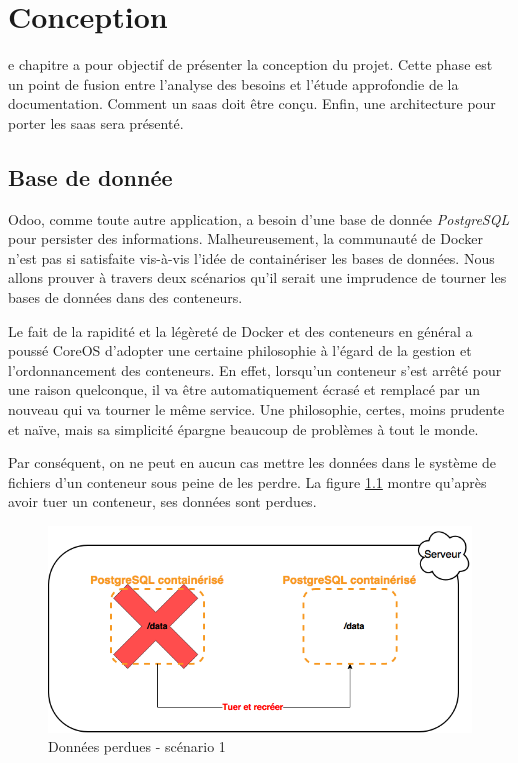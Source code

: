 \chapter{Conception}
\begin{onehalfspace}

e chapitre a pour objectif de présenter la conception du projet. Cette phase est un point de fusion entre l'analyse des besoins et l'étude approfondie de la documentation. Comment un \acrshort{saas} doit être conçu. Enfin, une architecture pour porter les \acrshort{saas} sera présenté.

\newpage

\section{Base de donnée}



Odoo, comme toute autre application, a besoin d'une base de donnée \emph{PostgreSQL} pour persister des informations. Malheureusement, la communauté de Docker n'est pas si satisfaite vis-à-vis l'idée de containériser les bases de données. Nous allons prouver à travers deux scénarios qu'il serait une imprudence de tourner les bases de données dans des conteneurs.

Le fait de la rapidité et la légèreté de Docker et des conteneurs en général a poussé CoreOS d'adopter une certaine philosophie à l'égard de la gestion et l'ordonnancement des conteneurs. En effet, lorsqu'un conteneur s'est arrêté pour une raison quelconque, il va être automatiquement écrasé et remplacé par un nouveau qui va tourner le même service. Une philosophie, certes, moins prudente et naïve, mais sa simplicité épargne beaucoup de problèmes à tout le monde.

Par conséquent, on ne peut en aucun cas mettre les données dans le système de fichiers d'un conteneur sous peine de les perdre. La figure \ref{fig:database1} montre qu'après avoir tuer un conteneur, ses données sont perdues.

\begin{figure}[H]
\centering
\includegraphics [scale=0.5]{chapitre4/assets/database1}
\caption{Données perdues - scénario 1}
\label{fig:database1}
\end{figure}


\end{onehalfspace}
